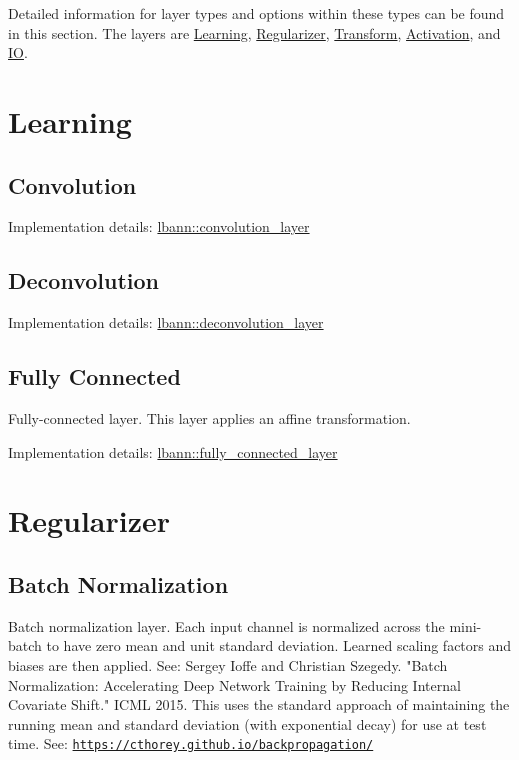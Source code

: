 Detailed information for layer types and options within these types can be found in this section. The layers are \hyperlink{layers_learning}{Learning}, \hyperlink{layers_regularizer}{Regularizer}, \hyperlink{layers_transform}{Transform}, \hyperlink{layers_activation}{Activation}, and \hyperlink{layers_i_o}{IO}.\hypertarget{layers_learning}{}\section{Learning}\label{layers_learning}
\hypertarget{layers_conv}{}\subsection{Convolution}\label{layers_conv}
Implementation details\+: \hyperlink{classlbann_1_1convolution__layer}{lbann\+::convolution\+\_\+layer}\hypertarget{layers_deconv}{}\subsection{Deconvolution}\label{layers_deconv}
Implementation details\+: \hyperlink{classlbann_1_1deconvolution__layer}{lbann\+::deconvolution\+\_\+layer}\hypertarget{layers_ip}{}\subsection{Fully Connected}\label{layers_ip}
Fully-\/connected layer. This layer applies an affine transformation.

Implementation details\+: \hyperlink{classlbann_1_1fully__connected__layer}{lbann\+::fully\+\_\+connected\+\_\+layer}\hypertarget{layers_regularizer}{}\section{Regularizer}\label{layers_regularizer}
\hypertarget{layers_batchNorm}{}\subsection{Batch Normalization}\label{layers_batchNorm}
Batch normalization layer. Each input channel is normalized across the mini-\/batch to have zero mean and unit standard deviation. Learned scaling factors and biases are then applied. See\+: Sergey Ioffe and Christian Szegedy. "Batch Normalization\+: Accelerating Deep Network Training by Reducing Internal Covariate Shift." I\+C\+ML 2015. This uses the standard approach of maintaining the running mean and standard deviation (with exponential decay) for use at test time. See\+: \href{https://cthorey.github.io/backpropagation/}{\tt https\+://cthorey.\+github.\+io/backpropagation/}

